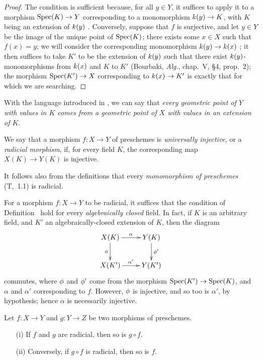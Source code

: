 \begin{proof}
\label{proof-prof-1.3.5.3}
The condition is sufficient because, for all $y\in Y$, it suffices to apply it to a morphism $\Spec(K)\to Y$ corresponding to a monomorphism $\kres(y)\to K$, with $K$ being an extension of $k(y)$ .
Conversely, suppose that $f$ is surjective, and let $y\in Y$ be the image of the unique point of $\operatorname{Spec}(K)$; there exists some $x\in X$ such that $f(x)=y$; we will consider the corresponding monomorphism $\kres(y)\to\kres(x)$ ; it then suffices to take $K'$ to be the extension of $k(y)$ such that there exist $k(y)$-monomorphisms from $k(x)$ and $K$ to $K'$ (Bourbaki, \emph{Alg.}, chap.~V, §4, prop.~2); the morphism $\Spec(K')\to X$ corresponding to $\kres(x)\to K'$ is exactly that for which we are searching.
\end{proof}

With the language introduced in , we can say that \emph{every geometric point of $Y$ with values in $K$ comes from a geometric point of $X$ with values in an extension of $K$}.

\begin{definition}[3.5.4]
\label{I.3.5.4}
We say that a morphism $f:X\to Y$ of preschemes is \emph{universally injective}, or a \emph{radicial morphism}, if, for every field $K$, the corresponding map $X(K)\to Y(K)$ is injective.
\end{definition}

It follows also from the definitions that every \emph{monomorphism of preschemes} (T,~1.1) is radicial.

\begin{env}[3.5.5]
\label{I.3.5.5}
For a morphism $f:X\to Y$ to be radicial, it suffices that the condition of Definition~ hold for every \emph{algebraically closed} field.
In fact, if $K$ is an arbitrary field, and $K'$ an algebraically-closed extension of $K$, then the diagram
\[
  \xymatrix{
    X(K)\ar[r]^\alpha\ar[d]_\vphi &
    Y(K)\ar[d]^{\vphi'}\\
    X(K')\ar[r]^{\alpha'} &
    Y(K')
  }
\]
commutes, where $\phi$ and $\phi'$ come from the morphism $\Spec(K')\to\Spec(K)$, and $\alpha$ and $\alpha'$ corresponding to $f$.
However, $\phi$ is injective, and so too is $\alpha'$, by hypothesis; hence $\alpha$ is necessarily injective.
\end{env}

\begin{proposition}[3.5.6]
\label{I.3.5.6}
Let $f:X\to Y$ and $g:Y\to Z$ be two morphisms of preschemes.
\begin{enumerate}
  \item[{\rm(i)}] If $f$ and $g$ are radicial, then so is $g\circ f$.
  \item[{\rm(ii)}] Conversely, if $g\circ f$ is radicial, then so is $f$.
\end{enumerate}
\end{proposition}

